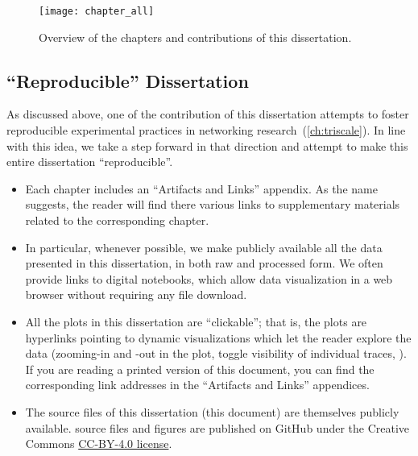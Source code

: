 \begin{figure}[!h]
  \centering
  \texttt{[image: chapter\_all]}
  \caption{Overview of the chapters and contributions of this dissertation.}
  \label{fig:chapter_all}
\end{figure}

\begin{subappendices}

\newpage
\section{``Reproducible'' Dissertation}

As discussed above, one of the contribution of this dissertation attempts to foster reproducible experimental practices in networking research~(\cref{ch:triscale}).
In line with this idea, we take a step forward in that direction and attempt to make this entire dissertation ``reproducible''.

\begin{itemize}

	\item
	Each chapter includes an ``Artifacts and Links'' appendix. As the name suggests, the reader will find there various links to supplementary materials related to the corresponding chapter.

	\item
	In particular, whenever possible, we make publicly available all the data presented in this dissertation, in both raw and processed form.
	We often provide links to digital notebooks, which allow data visualization in a web browser without requiring any file download.

	\item
	All the plots in this dissertation are ``clickable''; that is, the plots are hyperlinks pointing to dynamic visualizations which let the reader explore the data (\eg zooming-in and -out in the plot, toggle visibility of individual traces, \etc).
	If you are reading a printed version of this document, you can find the corresponding link addresses in the ``Artifacts and Links'' appendices.

	\item
	The source files of this dissertation (this document) are themselves publicly available.
	\tex source files and figures are published on GitHub under the Creative Commons \href{https://creativecommons.org/licenses/by/4.0/}{CC-BY-4.0 license}.


\end{itemize}
\end{subappendices}
